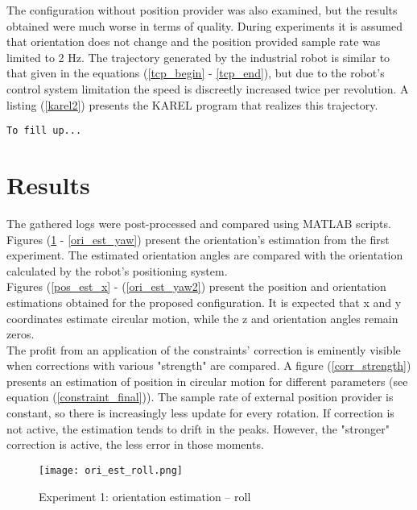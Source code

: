 The configuration without position provider was also examined, but the results obtained were much worse in terms of quality. During experiments it is assumed that orientation does not change and the position provided sample rate was limited to 2 Hz. The trajectory generated by the industrial robot is similar to that given in the equations (\ref{tcp_begin} - \ref{tcp_end}), but due to the robot's control system limitation the speed is discreetly increased twice per revolution. A listing (\ref{karel2}) presents the KAREL program that realizes this trajectory.

\begin{lstlisting}[caption={The KAREL program realizing a circular motion}, captionpos=b, label=karel2]
	To fill up...
\end{lstlisting}

\section{Results}

The gathered logs were post-processed and compared using MATLAB scripts. Figures (\ref{ori_est_roll} - \ref{ori_est_yaw}) present the orientation's estimation from the first experiment. The estimated orientation angles are compared with the orientation calculated by the robot's positioning system.\\

Figures (\ref{pos_est_x} - (\ref{ori_est_yaw2}) present the position and orientation estimations obtained for the proposed configuration. It is expected that x and y coordinates estimate circular motion, while the z and orientation angles remain zeros.\\

The profit from an application of the constraints' correction is eminently visible when corrections with various "strength" are compared.
A figure (\ref{corr_strength}) presents an estimation of position in circular motion for different parameters (see equation (\ref{constraint_final})). The sample rate of external position provider is constant, so there is increasingly less update for every rotation. If correction is not active, the estimation tends to drift in the peaks. However, the "stronger" correction is active, the less error in those moments.


\begin{figure}[p]
	\centering
	\texttt{[image: ori\_est\_roll.png]}
	\caption{Experiment 1: orientation estimation -- roll}
	\label{ori_est_roll}
\end{figure}

